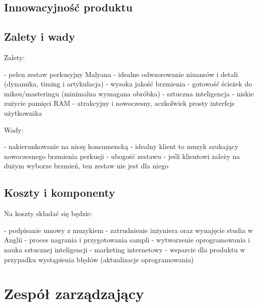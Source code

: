 \documentclass[12pt]{article}
\begin{document}
\subsection{Innowacyjność produktu}



\subsection{Zalety i wady}

Zalety:

- pełen zestaw perkusyjny Malyana
- idealne odwzorowanie niuansów i detali (dynamika, timing i artykulacja)
- wysoka jakość brzmienia
- gotowość ścieżek do miksu/masteringu (minimalna wymagana obróbka)
- sztuczna inteligencja
- niskie zużycie pamięci RAM
- atrakcyjny i nowoczesny, aczkolwiek prosty interfejs użytkownika

Wady:

- nakierunkowanie na niszę konsumencką - idealny klient to muzyk szukający
  nowoczesnego brzmienia perkusji
- ubogość zestawu - jeśli klientowi zależy na dużym wyborze brzmień, ten zestaw
  nie jest dla niego

\subsection{Koszty i komponenty}


Na koszty składać się będzie:

- podpisanie umowy z muzykiem
- zatrudnienie inżyniera oraz wynajęcie studia w Anglii
- proces nagrania i przygotowania sampli
- wytworzenie oprogramowania i nauka sztucznej inteligencji
- marketing internetowy
- wsparcie dla produktu w przypadku wystąpienia błędów (aktualizacje
  oprogramowania)

\section{Zespół zarządzający}
\end{document}
